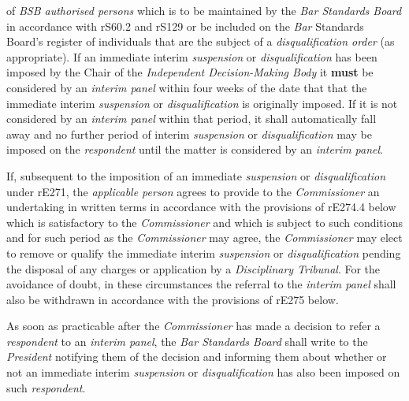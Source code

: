 of \emph{BSB authorised persons} which is to be maintained by
the \emph{Bar Standards Board} in accordance with rS60.2 and rS129 or be
included on the \emph{Bar }Standards Board's register of individuals
that are the subject of a \emph{disqualification order} (as
appropriate).\ln
{}
If an immediate interim \emph{suspension} or \emph{disqualification} has
been imposed by the Chair of the \emph{Independent Decision-Making
Body} it  \textcolor{myred}{\textbf{must}} be considered by an \emph{interim panel} within four weeks
of the date that that the immediate
interim \emph{suspension} or \emph{disqualification} is originally
imposed. If it is not considered by an \emph{interim panel} within that
period, it shall automatically fall away and no further period of
interim \emph{suspension} or \emph{disqualification} may be imposed on
the \emph{respondent} until the matter is considered by an \emph{interim
panel}.\\
\par
If, subsequent to the imposition of an
immediate \emph{suspension} or \emph{disqualification} under \textbf{ } rE271,
the \emph{applicable person} agrees to provide to
the \emph{Commissioner} an undertaking in written terms in accordance
with the provisions of rE274.4 below which is satisfactory to
the \emph{Commissioner} and which is subject to such conditions and for
such period as the \emph{Commissioner} may agree,
the \emph{Commissioner} may elect to remove or qualify the immediate
interim \emph{suspension} or \emph{disqualification} pending the
disposal of any charges or application by a \emph{Disciplinary
Tribunal}. For the avoidance of doubt, in these circumstances the
referral to the \emph{interim panel} shall also be withdrawn in
accordance with the provisions of rE275 below.\\
\par
{}
As soon as practicable after the \emph{Commissioner} has made a decision
to refer a \emph{respondent} to an \emph{interim
panel},\emph{ }the \emph{Bar Standards Board} shall write to
the \emph{President} notifying them of the decision and informing them
about whether or not an immediate
interim \emph{suspension} or \emph{disqualification} has also been
imposed on such \emph{respondent}.\\
